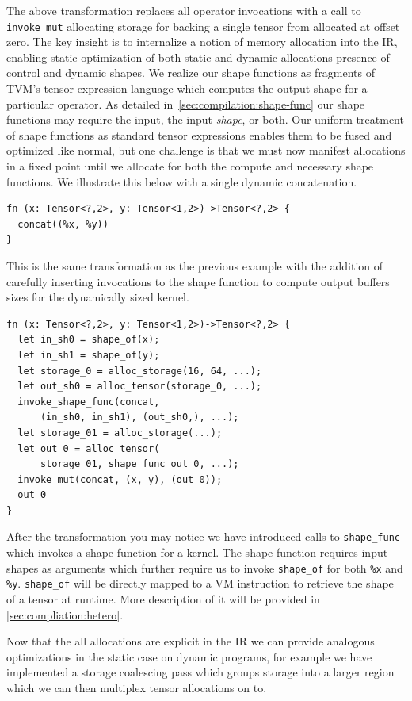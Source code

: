 The above transformation replaces all operator invocations with a call to \verb|invoke_mut| allocating storage
for backing a single tensor from allocated at offset zero.
The key insight is to internalize a notion of memory allocation into the IR, enabling static optimization of
both static and dynamic allocations presence of control and dynamic shapes. We realize our shape functions as fragments of TVM's tensor expression language which computes the output shape for a particular operator. As detailed in~\autoref{sec:compilation:shape-func} our shape functions may require the input, the input \textit{shape}, or both.
Our uniform treatment of shape functions as standard tensor expressions enables them to be fused and optimized like normal, but one challenge is that we must now manifest allocations in a fixed point until we allocate for both the compute and necessary shape functions. We illustrate this below with a single dynamic concatenation.

\begin{verbatim}
fn (x: Tensor<?,2>, y: Tensor<1,2>)->Tensor<?,2> {
  concat((%x, %y))
}
\end{verbatim}

This is the same transformation as the previous example with the addition of carefully inserting
invocations to the shape function to compute output buffers sizes for the dynamically sized kernel.

\begin{verbatim}
fn (x: Tensor<?,2>, y: Tensor<1,2>)->Tensor<?,2> {
  let in_sh0 = shape_of(x);
  let in_sh1 = shape_of(y);
  let storage_0 = alloc_storage(16, 64, ...);
  let out_sh0 = alloc_tensor(storage_0, ...);
  invoke_shape_func(concat,
      (in_sh0, in_sh1), (out_sh0,), ...);
  let storage_01 = alloc_storage(...);
  let out_0 = alloc_tensor(
      storage_01, shape_func_out_0, ...);
  invoke_mut(concat, (x, y), (out_0));
  out_0
}
\end{verbatim}

After the transformation you may notice we have introduced calls to \verb|shape_func| which invokes a shape function for a kernel. The shape function requires input shapes as arguments which further require us to invoke \verb|shape_of| for both \verb|%x| and \verb|%y|. \verb|shape_of| will be directly mapped to a VM instruction to retrieve the shape of a tensor at runtime. More description of it will be provided in \autoref{sec:compliation:hetero}.

Now that the all allocations are explicit in the IR we can provide analogous optimizations in the static
case on dynamic programs, for example we have implemented a storage coalescing pass which groups storage
into a larger region which we can then multiplex tensor allocations on to.

